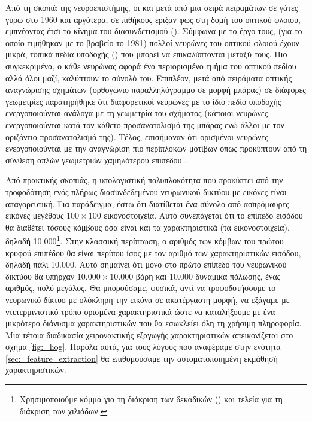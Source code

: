 Από τη σκοπιά της νευροεπιστήμης, οι  και  μετά από μια σειρά πειραμάτων σε γάτες \cite{hubel1959single, hubel1959receptive} γύρω στο 1960 και αργότερα, σε πιθήκους \cite{hubel1968receptive} έριξαν φως στη δομή του οπτικού φλοιού, εμπνέοντας έτσι το κίνημα του διασυνδετισμού (). Σύμφωνα με το έργο τους, (για το οποίο τιμήθηκαν με το βραβείο  το 1981) πολλοί νευρώνες του οπτικού φλοιού έχουν μικρά, τοπικά πεδία υποδοχής () που μπορεί να επικαλύπτονται μεταξύ τους. Πιο συγκεκριμένα, ο κάθε νευρώνας αφορά ένα περιορισμένο τμήμα του οπτικού πεδίου αλλά όλοι μαζί, καλύπτουν το σύνολό του. Επιπλέον, μετά από πειράματα οπτικής αναγνώρισης σχημάτων (ορθογώνιο παραλληλόγραμμο σε μορφή μπάρας) σε διάφορες γεωμετρίες παρατηρήθηκε ότι διαφορετικοί νευρώνες με το ίδιο πεδίο υποδοχής ενεργοποιούνται ανάλογα με τη γεωμετρία του σχήματος (κάποιοι νευρώνες ενεργοποιούνται κατά τον κάθετο προσανατολισμό της μπάρας ενώ άλλοι με τον οριζόντιο προσανατολισμό της). Τέλος, επισήμαναν ότι ορισμένοι νευρώνες ενεργοποιούνται με την αναγνώριση πιο περίπλοκων μοτίβων όπως προκύπτουν από τη σύνθεση απλών γεωμετριών χαμηλότερου επιπέδου \cite{geron2019hands}. \par
 
Από πρακτικής σκοπιάς, η υπολογιστική πολυπλοκότητα που προκύπτει από την τροφοδότηση ενός πλήρως διασυνδεδεμένου νευρωνικού δικτύου με εικόνες είναι απαγορευτική. Για παράδειγμα, έστω ότι διατίθεται ένα σύνολο από ασπρόμαυρες εικόνες μεγέθους $100 \times 100$ εικονοστοιχεία. Αυτό συνεπάγεται ότι το επίπεδο εισόδου θα διαθέτει τόσους κόμβους όσα είναι και τα χαρακτηριστικά (τα εικονοστοιχεία), δηλαδή 10.000\footnote{Χρησιμοποιούμε κόμμα για τη διάκριση των δεκαδικών () και τελεία για τη διάκριση των χιλιάδων.}. Στην κλασσική περίπτωση, ο αριθμός των κόμβων του πρώτου κρυφού επιπέδου θα είναι περίπου ίσος με τον αριθμό των χαρακτηριστικών εισόδου, δηλαδή πάλι 10.000. Αυτό σημαίνει ότι μόνο στο πρώτο επίπεδο του νευρωνικού δικτύου θα υπήρχαν $10.000 \times 10.000$ βάρη και $10.000$ δυναμικά πόλωσης, ένας αριθμός, πολύ μεγάλος. Θα μπορούσαμε, φυσικά, αντί να τροφοδοτήσουμε το νευρωνικό δίκτυο με ολόκληρη την εικόνα σε ακατέργαστη μορφή, να εξάγαμε με ντετερμινιστικό τρόπο ορισμένα χαρακτηριστικά ώστε να καταλήξουμε με ένα μικρότερο διάνυσμα χαρακτηριστικών που θα εσωκλείει όλη τη χρήσιμη πληροφορία. Μια τέτοια διαδικασία χειρονακτικής εξαγωγής χαρακτηριστικών απεικονίζεται στο σχήμα \ref{fig:_hog}. Παρόλα αυτά, για τους λόγους που αναφέραμε στην ενότητα \ref{sec:_feature_extraction} θα επιθυμούσαμε την αυτοματοποιημένη εκμάθησή χαρακτηριστικών.\par

